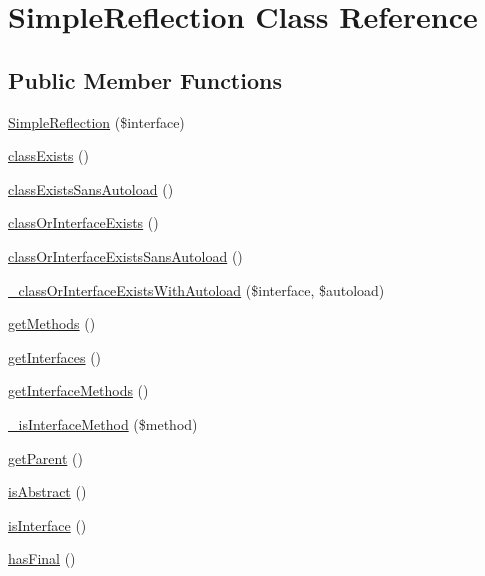 \hypertarget{class_simple_reflection}{
\section{SimpleReflection Class Reference}
\label{class_simple_reflection}
}
\subsection*{Public Member Functions}
\begin{DoxyCompactItemize}
\item 
\hyperlink{class_simple_reflection_ac007edb9004920791d628cad6b234484}{SimpleReflection} (\$interface)
\item 
\hyperlink{class_simple_reflection_a168085582bea3184f879f72ca081d833}{classExists} ()
\item 
\hyperlink{class_simple_reflection_a9bd0c823a0712540af7dcf77b371ff31}{classExistsSansAutoload} ()
\item 
\hyperlink{class_simple_reflection_af18aa4a7e354dcf43a5423b27a2a8760}{classOrInterfaceExists} ()
\item 
\hyperlink{class_simple_reflection_acea353e896b1cd11e7f11fc618297238}{classOrInterfaceExistsSansAutoload} ()
\item 
\hyperlink{class_simple_reflection_ac2d030d93a1d5169d886e2bfe878fa01}{\_\-classOrInterfaceExistsWithAutoload} (\$interface, \$autoload)
\item 
\hyperlink{class_simple_reflection_af595c3f6cffaa3c4c7d6993a65e59206}{getMethods} ()
\item 
\hyperlink{class_simple_reflection_a6ed9bfcb7b8dd94903537d783c536f17}{getInterfaces} ()
\item 
\hyperlink{class_simple_reflection_aacb55dfc402458422e376227aa54dd91}{getInterfaceMethods} ()
\item 
\hyperlink{class_simple_reflection_abd74b1744a218f103d5d96ad95ce6f13}{\_\-isInterfaceMethod} (\$method)
\item 
\hyperlink{class_simple_reflection_a365526e84d55ce7c97ab78c7770db46e}{getParent} ()
\item 
\hyperlink{class_simple_reflection_aed337e5d22f6ec345fc1b74e09852156}{isAbstract} ()
\item 
\hyperlink{class_simple_reflection_ae5838a6f80eb13ce9ffc1f935ff0768d}{isInterface} ()
\item 
\hyperlink{class_simple_reflection_a643ff5d07c0c1e6d24a6c7fad36da9af}{hasFinal} ()
\item 

\end{DoxyCompactItemize}
